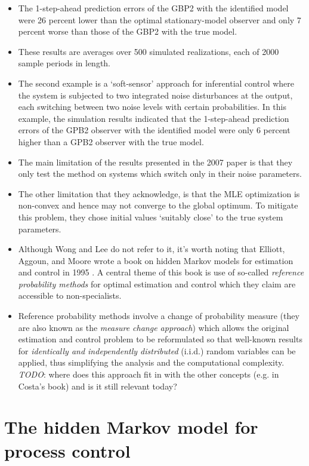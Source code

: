 \begin{itemize}
	\item The 1-step-ahead prediction errors of the GBP2 with the identified model were 26 percent lower than the optimal stationary-model observer and only 7 percent worse than those of the GBP2 with the true model.
	\item These results are averages over 500 simulated realizations, each of 2000 sample periods in length.
	\item The second example is a `soft-sensor' approach for inferential control where the system is subjected to two integrated noise disturbances at the output, each switching between two noise levels with certain probabilities. In this example, the simulation results indicated that the 1-step-ahead prediction errors of the GPB2 observer with the identified model were only 6 percent higher than a GPB2 observer with the true model.
	\item The main limitation of the results presented in the 2007 paper is that they only test the method on systems which switch only in their noise parameters.
	\item The other limitation that they acknowledge, is that the MLE optimization is non-convex and hence may not converge to the global optimum. To mitigate this problem, they chose initial values `suitably close' to the true system parameters.
	\item Although Wong and Lee do not refer to it, it's worth noting that Elliott, Aggoun, and Moore wrote a book on hidden Markov models for estimation and control in 1995 \cite{elliott_hidden_1995}. A central theme of this book is use of so-called \textit{reference probability methods} for optimal estimation and control which they claim are accessible to non-specialists.
	\item Reference probability methods involve a change of probability measure (they are also known as the \textit{measure change approach}) which allows the original estimation and control problem to be reformulated so that well-known results for \textit{identically and independently distributed} (i.i.d.) random variables can be applied, thus simplifying the analysis and the computational complexity. \emph{TODO}: where does this approach fit in with the other concepts (e.g. in Costa's book) and is it still relevant today?
\end{itemize}

\section*{The hidden Markov model for process control}
\label{hmm_control}

